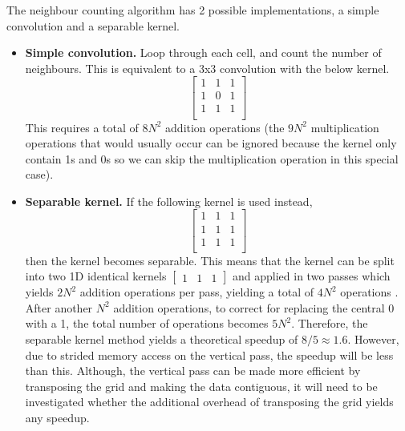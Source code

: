     The neighbour counting algorithm has 2 possible implementations, a simple convolution and a separable kernel.
    \begin{itemize}
        \item \textbf{Simple convolution.} Loop through each cell, and count the number of neighbours.
            This is equivalent to a 3x3 convolution with the below kernel.
            \begin{equation}
            \begin{bmatrix}
            1 & 1 & 1 \\
            1 & 0 & 1 \\
            1 & 1 & 1 \\
            \end{bmatrix}\label{eq:kernel1}
            \end{equation}
            This requires a total of $8N^{2}$ addition operations (the $9N^{2}$ multiplication operations that would usually occur can
            be ignored because the kernel only contain 1s and 0s so we can skip the multiplication operation in this special case).
        \item \textbf{Separable kernel.} If the following kernel is used instead,
            \begin{equation}
            \begin{bmatrix}
            1 & 1 & 1 \\
            1 & 1 & 1 \\
            1 & 1 & 1 \\
            \end{bmatrix}\label{eq:kernel2}
            \end{equation}
            then the kernel becomes separable.
            This means that the kernel can be split into two 1D identical kernels \(\begin{bmatrix} 1 & 1 & 1 \end{bmatrix}\) and
            applied in two passes which yields $2N^{2}$ addition operations per pass, yielding a total of $4N^{2}$ operations \cite{separable-kernel}.
            After another ${N^{2}}$ addition operations, to correct for replacing the central 0 with a 1, the total number of
            operations becomes $5N^{2}$.
            Therefore, the separable kernel method yields a theoretical speedup of $8/5 \approx 1.6$.
            However, due to strided memory access on the vertical pass, the speedup will be less than this.
            Although, the vertical pass can be made more efficient by transposing the grid and making the data contiguous,
            it will need to be investigated whether the additional overhead of transposing the grid yields any speedup.
    \end{itemize}

